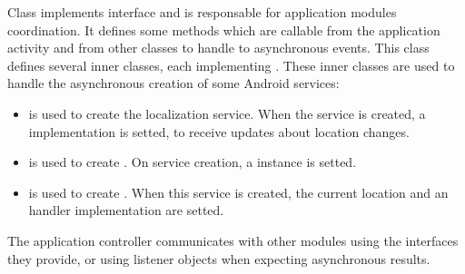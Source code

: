 Class  implements  interface and is responsable for application modules coordination. It defines some methods which are callable from the application activity and from other classes to handle to asynchronous events. This class defines several inner classes, each implementing . These inner classes are used to handle the asynchronous creation of some Android services:
	\begin{itemize}
		\item {} is used to create the localization service. When the service is created, a  implementation is setted, to receive updates about location changes.  
		\item {} is used to create . On service creation, a  instance is setted.
		\item {} is used to create . When this service is created, the current location and an handler implementation are setted.   
	\end{itemize}  
	
The application controller communicates with other modules using the interfaces they provide, or using listener objects when expecting asynchronous results.
